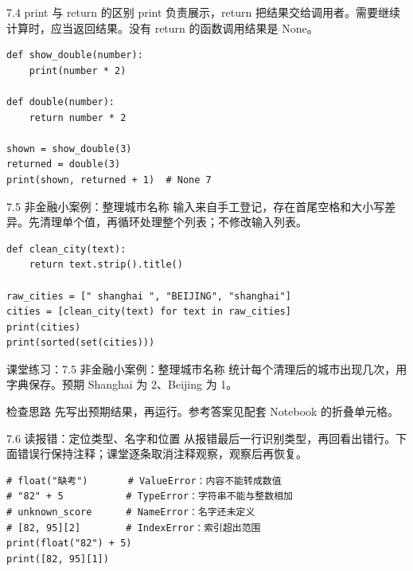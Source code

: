 \begin{frame}[fragile]{7.4 print 与 return 的区别}
\small print 负责展示，return 把结果交给调用者。需要继续计算时，应当返回结果。没有 return 的函数调用结果是 None。
\medskip
\begin{lstlisting}
def show_double(number):
    print(number * 2)

def double(number):
    return number * 2

shown = show_double(3)
returned = double(3)
print(shown, returned + 1)  # None 7
\end{lstlisting}
\end{frame}

\begin{frame}[fragile]{7.5 非金融小案例：整理城市名称}
\small 输入来自手工登记，存在首尾空格和大小写差异。先清理单个值，再循环处理整个列表；不修改输入列表。
\medskip
\begin{lstlisting}
def clean_city(text):
    return text.strip().title()

raw_cities = [" shanghai ", "BEIJING", "shanghai"]
cities = [clean_city(text) for text in raw_cities]
print(cities)
print(sorted(set(cities)))
\end{lstlisting}
\end{frame}
\begin{frame}[fragile]{课堂练习：7.5 非金融小案例：整理城市名称}
统计每个清理后的城市出现几次，用字典保存。预期 Shanghai 为 2、Beijing 为 1。
\medskip
\begin{block}{检查思路}
先写出预期结果，再运行。参考答案见配套 Notebook 的折叠单元格。
\end{block}
\end{frame}

\begin{frame}[fragile]{7.6 读报错：定位类型、名字和位置}
\small 从报错最后一行识别类型，再回看出错行。下面错误行保持注释；课堂逐条取消注释观察，观察后再恢复。
\medskip
\begin{lstlisting}
# float("缺考")       # ValueError：内容不能转成数值
# "82" + 5           # TypeError：字符串不能与整数相加
# unknown_score      # NameError：名字还未定义
# [82, 95][2]        # IndexError：索引超出范围
print(float("82") + 5)
print([82, 95][1])
\end{lstlisting}
\end{frame}
